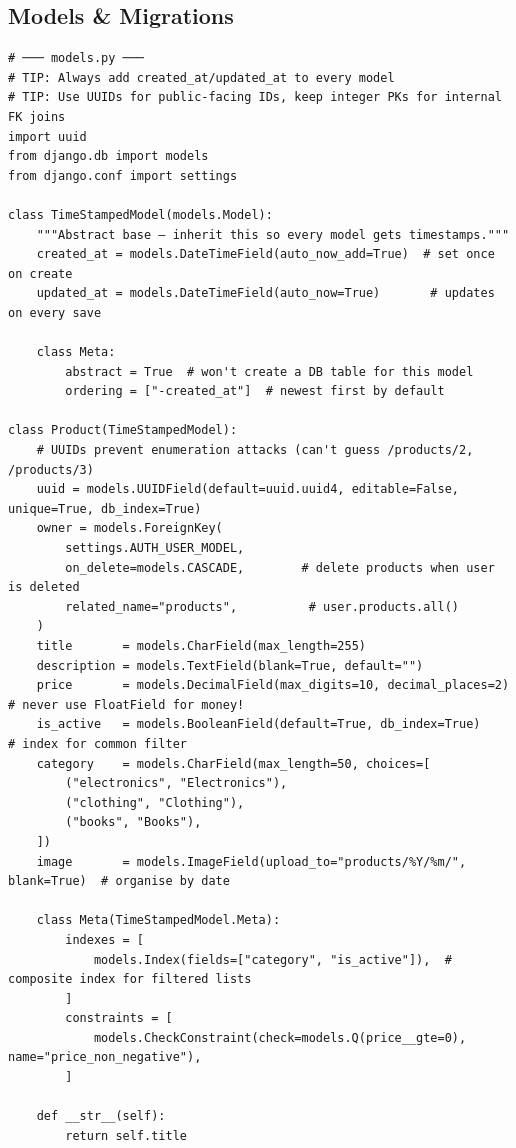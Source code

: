 \documentclass[10pt, a4paper]{article}
\begin{document}
\subsection{Models \& Migrations}


\begin{lstlisting}[language=mypython]
# ─── models.py ───
# TIP: Always add created_at/updated_at to every model
# TIP: Use UUIDs for public-facing IDs, keep integer PKs for internal FK joins
import uuid
from django.db import models
from django.conf import settings

class TimeStampedModel(models.Model):
    """Abstract base — inherit this so every model gets timestamps."""
    created_at = models.DateTimeField(auto_now_add=True)  # set once on create
    updated_at = models.DateTimeField(auto_now=True)       # updates on every save
    
    class Meta:
        abstract = True  # won't create a DB table for this model
        ordering = ["-created_at"]  # newest first by default

class Product(TimeStampedModel):
    # UUIDs prevent enumeration attacks (can't guess /products/2, /products/3)
    uuid = models.UUIDField(default=uuid.uuid4, editable=False, unique=True, db_index=True)
    owner = models.ForeignKey(
        settings.AUTH_USER_MODEL,
        on_delete=models.CASCADE,        # delete products when user is deleted
        related_name="products",          # user.products.all()
    )
    title       = models.CharField(max_length=255)
    description = models.TextField(blank=True, default="")
    price       = models.DecimalField(max_digits=10, decimal_places=2)  # never use FloatField for money!
    is_active   = models.BooleanField(default=True, db_index=True)       # index for common filter
    category    = models.CharField(max_length=50, choices=[
        ("electronics", "Electronics"),
        ("clothing", "Clothing"),
        ("books", "Books"),
    ])
    image       = models.ImageField(upload_to="products/%Y/%m/", blank=True)  # organise by date
    
    class Meta(TimeStampedModel.Meta):
        indexes = [
            models.Index(fields=["category", "is_active"]),  # composite index for filtered lists
        ]
        constraints = [
            models.CheckConstraint(check=models.Q(price__gte=0), name="price_non_negative"),
        ]
    
    def __str__(self):
        return self.title
\end{lstlisting}
\end{document}
